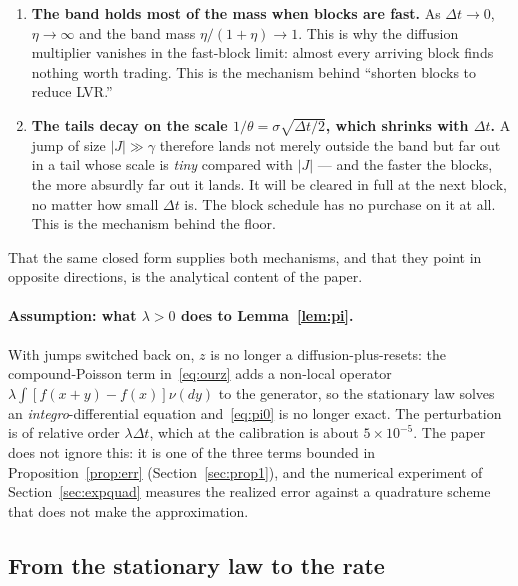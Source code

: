 \documentclass[11pt]{article}
\theoremstyle{definition}
\theoremstyle{remark}
\newcommand{\dt}{\Delta t}
\newcommand{\1}{\mathbf{1}}
\begin{document}
\begin{enumerate}[leftmargin=2em]
\item \textbf{The band holds most of the mass when blocks are fast.} As $\dt \to 0$, $\eta \to \infty$ and the band mass $\eta/(1+\eta) \to 1$. This is why the diffusion multiplier vanishes in the fast-block limit: almost every arriving block finds nothing worth trading. This is the mechanism behind ``shorten blocks to reduce LVR.''

\item \textbf{The tails decay on the scale $1/\theta = \sigma\sqrt{\dt/2}$, which shrinks with $\dt$.} A jump of size $|J| \gg \gamma$ therefore lands not merely outside the band but far out in a tail whose scale is \emph{tiny} compared with $|J|$ --- and the faster the blocks, the more absurdly far out it lands. It will be cleared in full at the next block, no matter how small $\dt$ is. The block schedule has no purchase on it at all. This is the mechanism behind the floor.
\end{enumerate}

That the same closed form supplies both mechanisms, and that they point in opposite directions, is the analytical content of the paper.

\paragraph{Assumption: what $\lambda > 0$ does to Lemma~\ref{lem:pi}.}
With jumps switched back on, $z$ is no longer a diffusion-plus-resets: the compound-Poisson term in~\eqref{eq:ourz} adds a non-local operator $\lambda\int[f(x+y)-f(x)]\nu(dy)$ to the generator, so the stationary law solves an \emph{integro}-differential equation and~\eqref{eq:pi0} is no longer exact. The perturbation is of relative order $\lambda\dt$, which at the calibration is about $5\times10^{-5}$. The paper does not ignore this: it is one of the three terms bounded in Proposition~\ref{prop:err} (Section~\ref{sec:prop1}), and the numerical experiment of Section~\ref{sec:expquad} measures the realized error against a quadrature scheme that does not make the approximation.

\subsection{From the stationary law to the rate}\label{sec:ratestat}
\end{document}
